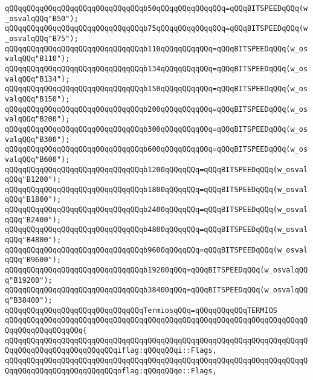 \verb|qQQqqQQqqQQqqQQqqQQqqQQqqQQqqQQqb50qQQqqQQqqQQqqQQq=qQQqBITSPEEDqQQq(w_osvalqQQq"B50");|\newline
\verb|qQQqqQQqqQQqqQQqqQQqqQQqqQQqqQQqb75qQQqqQQqqQQqqQQq=qQQqBITSPEEDqQQq(w_osvalqQQq"B75");|\newline
\verb|qQQqqQQqqQQqqQQqqQQqqQQqqQQqqQQqb110qQQqqQQqqQQq=qQQqBITSPEEDqQQq(w_osvalqQQq"B110");|\newline
\verb|qQQqqQQqqQQqqQQqqQQqqQQqqQQqqQQqb134qQQqqQQqqQQq=qQQqBITSPEEDqQQq(w_osvalqQQq"B134");|\newline
\verb|qQQqqQQqqQQqqQQqqQQqqQQqqQQqqQQqb150qQQqqQQqqQQq=qQQqBITSPEEDqQQq(w_osvalqQQq"B150");|\newline
\verb|qQQqqQQqqQQqqQQqqQQqqQQqqQQqqQQqb200qQQqqQQqqQQq=qQQqBITSPEEDqQQq(w_osvalqQQq"B200");|\newline
\verb|qQQqqQQqqQQqqQQqqQQqqQQqqQQqqQQqb300qQQqqQQqqQQq=qQQqBITSPEEDqQQq(w_osvalqQQq"B300");|\newline
\verb|qQQqqQQqqQQqqQQqqQQqqQQqqQQqqQQqb600qQQqqQQqqQQq=qQQqBITSPEEDqQQq(w_osvalqQQq"B600");|\newline
\verb|qQQqqQQqqQQqqQQqqQQqqQQqqQQqqQQqb1200qQQqqQQq=qQQqBITSPEEDqQQq(w_osvalqQQq"B1200");|\newline
\verb|qQQqqQQqqQQqqQQqqQQqqQQqqQQqqQQqb1800qQQqqQQq=qQQqBITSPEEDqQQq(w_osvalqQQq"B1800");|\newline
\verb|qQQqqQQqqQQqqQQqqQQqqQQqqQQqqQQqb2400qQQqqQQq=qQQqBITSPEEDqQQq(w_osvalqQQq"B2400");|\newline
\verb|qQQqqQQqqQQqqQQqqQQqqQQqqQQqqQQqb4800qQQqqQQq=qQQqBITSPEEDqQQq(w_osvalqQQq"B4800");|\newline
\verb|qQQqqQQqqQQqqQQqqQQqqQQqqQQqqQQqb9600qQQqqQQq=qQQqBITSPEEDqQQq(w_osvalqQQq"B9600");|\newline
\verb|qQQqqQQqqQQqqQQqqQQqqQQqqQQqqQQqb19200qQQq=qQQqBITSPEEDqQQq(w_osvalqQQq"B19200");|\newline
\verb|qQQqqQQqqQQqqQQqqQQqqQQqqQQqqQQqb38400qQQq=qQQqBITSPEEDqQQq(w_osvalqQQq"B38400");|\newline
\newline
\verb|qQQqqQQqqQQqqQQqqQQqqQQqqQQqqQQqTermiosqQQq=qQQqqQQqqQQqTERMIOS|\newline
\verb|qQQqqQQqqQQqqQQqqQQqqQQqqQQqqQQqqQQqqQQqqQQqqQQqqQQqqQQqqQQqqQQqqQQqqQQqqQQqqQQqqQQqqQQq{|\newline
\verb|qQQqqQQqqQQqqQQqqQQqqQQqqQQqqQQqqQQqqQQqqQQqqQQqqQQqqQQqqQQqqQQqqQQqqQQqqQQqqQQqqQQqqQQqqQQqqQQqiflag:qQQqqQQqi::Flags,|\newline
\verb|qQQqqQQqqQQqqQQqqQQqqQQqqQQqqQQqqQQqqQQqqQQqqQQqqQQqqQQqqQQqqQQqqQQqqQQqqQQqqQQqqQQqqQQqqQQqqQQqoflag:qQQqqQQqo::Flags,|\newline

